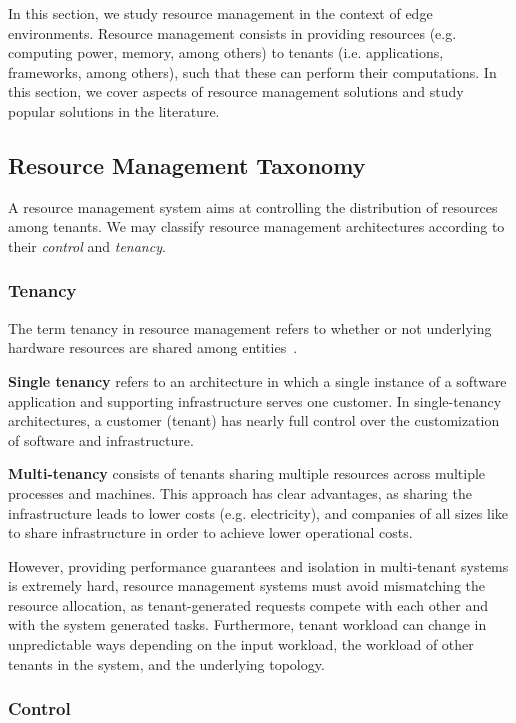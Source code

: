 
In this section, we study resource management in the context of edge environments. Resource management consists in providing resources (e.g. computing power, memory, among others) to tenants (i.e. applications, frameworks, among others), such that these can perform their computations. In this section, we cover aspects of resource management solutions and study popular solutions in the literature.

\subsection{Resource Management Taxonomy}

A resource management system aims at controlling the distribution of resources among tenants. We may classify resource management architectures according to their \textit{control} and \textit{tenancy}.

\subsubsection{Tenancy}

The term tenancy in resource management refers to whether or not underlying hardware resources are shared among entities~\cite{Hong2019}.

\textbf{Single tenancy} refers to an architecture in which a single instance of a software application and supporting infrastructure serves one customer. In single-tenancy architectures, a customer (tenant) has nearly full control over the customization of software and infrastructure.

\textbf{Multi-tenancy} consists of tenants sharing multiple resources across multiple processes and machines. This approach has clear advantages, as sharing the infrastructure leads to lower costs (e.g. electricity), and companies of all sizes like to share infrastructure in order to achieve lower operational costs.

However, providing performance guarantees and isolation in multi-tenant systems is extremely hard, resource management systems must avoid mismatching the resource allocation, as tenant-generated requests compete with each other and with the system generated tasks. Furthermore, tenant workload can change in unpredictable ways depending on the input workload, the workload of other tenants in the system, and the underlying topology.

\subsubsection{Control}

